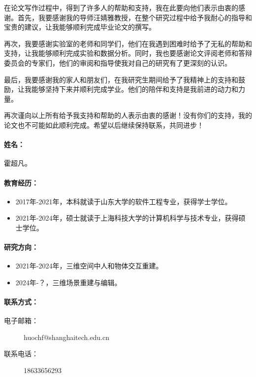 \documentclass[master]{shtthesis}
\makeatletter
\def\ifgraduate{\ifsht@graduate}
\makeatother
\begin{document}
\makebiblio

\backmatter
\begin{acknowledgement}
在论文写作过程中，得到了许多人的帮助和支持，我在此要向他们表示由衷的感谢。首先，我要感谢我的导师汪婧雅教授，在整个研究过程中给予我耐心的指导和宝贵的建议，让我能够顺利完成毕业论文的撰写。

再次，我要感谢实验室的老师和同学们，他们在我遇到困难时给予了无私的帮助和支持，让我能够顺利完成实验和数据分析。同时，我也要感谢论文评阅老师和答辩委员会的专家们，他们的审阅和指导使我对自己的研究有了更深刻的认识。

最后，我要感谢我的家人和朋友们，在我研究生期间给予了我精神上的支持和鼓励，让我能够坚持下来并顺利完成学业。他们的陪伴和支持是我前进的动力和力量。

再次谨向以上所有给予我支持和帮助的人表示由衷的感谢！没有你们的支持，我的论文也不可能如此顺利完成。希望以后继续保持联系，共同进步！
\end{acknowledgement}

\ifgraduate
\begin{resume}
    \paragraph{姓名：} 霍超凡。
    \paragraph{教育经历：}
    \begin{itemize}
        \item 2017年-2021年，本科就读于山东大学的软件工程专业，获得学士学位。
        \item 2021年-2024年，硕士就读于上海科技大学的计算机科学与技术专业，获得硕士学位。
    \end{itemize}

    \paragraph{研究方向：}
    \begin{itemize}
        \item 2021年-2024年，三维空间中人和物体交互重建。
        \item 2024年-？，三维场景重建与编辑。
    \end{itemize}
    \paragraph{联系方式：}
    \begin{description}
        \item[电子邮箱：] huochf@shanghaitech.edu.cn
        \item[联系电话：] 18633656293
    \end{description}
\end{resume}
\end{document}
